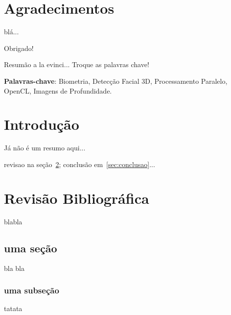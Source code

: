 \documentclass[a4paper]{abnt}
\begin{document}

\capa
\folhaderosto


\chapter*{Agradecimentos}

blá...

Obrigado!


\setcounter{page}{1}

\sumario

\begin{resumo}

Resumão a la evinci...
Troque as palavras chave!

\noindent \textbf{Palavras-chave}: Biometria, Detecção Facial 3D, Processamento Paralelo, OpenCL, Imagens de Profundidade.

\end{resumo}	

\chapter{Introdução}
\setcounter{page}{10}

Já não é um resumo aqui...

revisao na seção~\ref{sec:revisao_bibliografica}; conclusão em~\ref{sec:conclusao}...

\chapter{Revisão Bibliográfica}
\label{sec:revisao_bibliografica}

blabla

\section{uma seção}

bla bla

\subsection{uma subseção}

tatata




\end{document}
